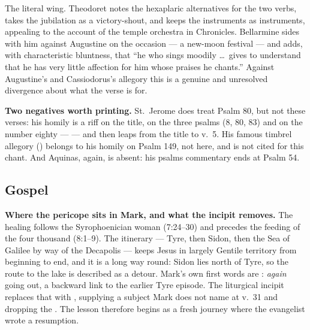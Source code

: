 \begin{witnessnote}
The literal wing. Theodoret notes the hexaplaric alternatives for the two
verbs, takes the jubilation as a victory-shout, and keeps the instruments as
instruments, appealing to the account of the temple orchestra in Chronicles.
Bellarmine sides with him against Augustine on the occasion --- a new-moon
festival --- and adds, with characteristic bluntness, that ``he who sings
moodily \dots\ gives to understand that he has very little affection for him
whose praises he chants.'' Against Augustine's and Cassiodorus's allegory this
is a genuine and unresolved divergence about what the verse is for.
\end{witnessnote}

\textbf{Two negatives worth printing.} St.~Jerome does treat Psalm 80, but not
these verses: his homily is a riff on the title, on the three
 psalms (8, 80, 83) and on the number eighty ---
 --- and then leaps from the title to v.~5.
His famous timbrel allegory () belongs to his homily on Psalm 149, not here, and
is not cited for this chant. And Aquinas, again, is absent: his psalms
commentary ends at Psalm 54.

\elementguard
\subsection*{Gospel }


\textbf{Where the pericope sits in Mark, and what the incipit removes.} The
healing follows the Syrophoenician woman (7:24--30) and precedes the feeding of
the four thousand (8:1--9). The itinerary --- Tyre, then Sidon, then the Sea of
Galilee by way of the Decapolis --- keeps Jesus in largely Gentile territory
from beginning to end, and it is a long way round: Sidon lies north of Tyre, so
the route to the lake is described as a detour. Mark's own first words are
: \textit{again} going out, a backward link to the
earlier Tyre episode. The liturgical incipit replaces that with , supplying a subject Mark does not name at v.~31 and
dropping the . The lesson therefore begins as a fresh journey
where the evangelist wrote a resumption.

